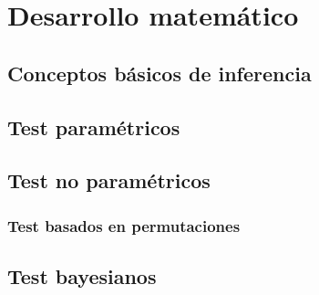 %
%


\chapter{Desarrollo matemático}

\section{Conceptos básicos de inferencia}

\section{Test paramétricos}

\section{Test no paramétricos}

	\subsection{Test basados en permutaciones}

\section{Test bayesianos}	
%